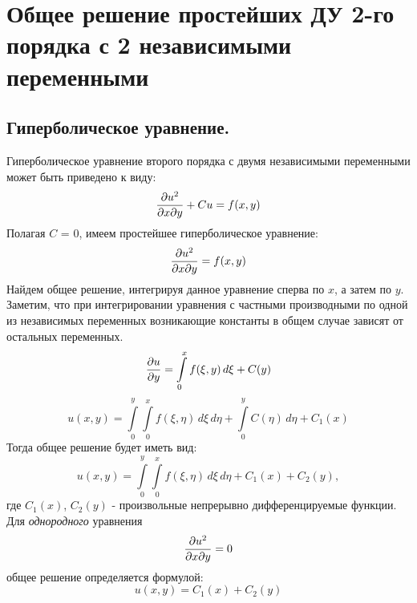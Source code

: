 \documentclass[../main.tex]{subfiles}
\begin{document}
\section{Общее решение простейших ДУ 2-го порядка с 2 независимыми переменными}
\subsection{Гиперболическое уравнение.}
Гиперболическое уравнение второго порядка с двумя независимыми переменными может быть приведено к виду:
\[
	\pderivtwo{u}{x}{y} + Cu = f(x, y)
\]
Полагая $C$ = 0, имеем простейшее гиперболическое уравнение:
\begin{equation}
	\pderivtwo{u}{x}{y} = f(x, y)
\end{equation}
Найдем общее решение, интегрируя данное уравнение сперва по $x$, а затем по $y$. \\Заметим, что при интегрировании уравнения с частными производными по одной из независимых переменных возникающие константы в общем случае зависят от остальных переменных.
\[
	\frac{\partial u}{\partial y} = \int\limits_{0}^{x}f(\xi, y)\,d\xi + C(y)
\]
\[
	u(x,y) = \int\limits_{0}^{y}\int\limits_{0}^{x}f(\xi, \eta)\,d\xi\,d\eta + \int\limits_{0}^{y}C(\eta)\,d\eta + C_1(x)
\]
Тогда общее решение будет иметь вид:
\begin{equation}
	u(x,y) = \int\limits_{0}^{y}\int\limits_{0}^{x}f(\xi, \eta)\,d\xi\,d\eta + C_1(x) + C_2(y),
\end{equation}
где $C_1(x)$, $C_2(y)$ - произвольные непрерывно дифференцируемые функции.\\
Для \textit{однородного} уравнения
\[
	\pderivtwo{u}{x}{y} = 0
\]
общее решение определяется формулой:
\[
	u(x,y) = C_1(x) + C_2(y)
\]
\end{document}
